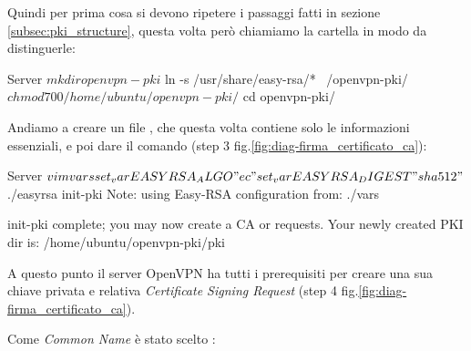 Quindi per prima cosa si devono ripetere i passaggi fatti in sezione \ref{subsec:pki_structure}, questa volta però chiamiamo la cartella  in modo da distinguerle:

\begin{bashcode}{Server}{}
$ mkdir openvpn-pki
$ ln -s /usr/share/easy-rsa/* ~/openvpn-pki/
$ chmod 700 /home/ubuntu/openvpn-pki/
$ cd openvpn-pki/
\end{bashcode}

Andiamo a creare un file , che questa volta contiene solo le informazioni essenziali, e poi dare il comando  (step 3 fig.\ref{fig:diag-firma_certificato_ca}):

\begin{bashcode}{Server}{}
$ vim vars
set_var EASYRSA_ALGO    "ec"
set_var EASYRSA_DIGEST  "sha512"
$ ./easyrsa init-pki
Note: using Easy-RSA configuration from: ./vars

init-pki complete; you may now create a CA or requests.
Your newly created PKI dir is: /home/ubuntu/openvpn-pki/pki
\end{bashcode}

A questo punto il server OpenVPN ha tutti i prerequisiti per creare una sua chiave privata e relativa \textit{Certificate Signing Request} (step 4 fig.\ref{fig:diag-firma_certificato_ca}). 

Come \textit{Common Name} è stato scelto :


